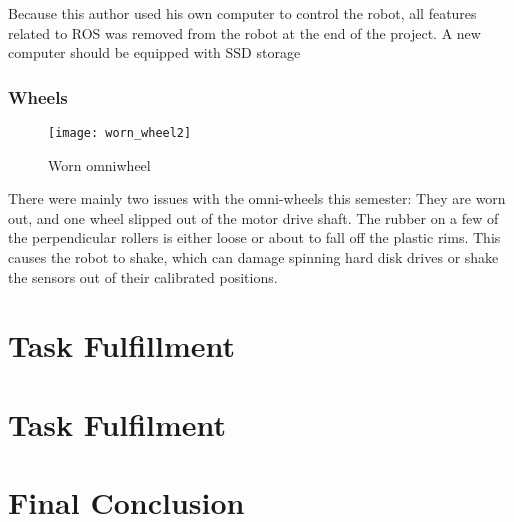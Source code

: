 Because this author used his own computer to control the robot, all features related to \ac{ROS} was removed from the robot at the end of the project. A new computer should be equipped with \ac{SSD} storage

\subsubsection{Wheels}

\begin{wrapfigure}{r}{0.5\textwidth}
	\vspace{-20pt}
	\begin{center}
		\texttt{[image: worn\_wheel2]}
	\end{center}
	
	\caption{Worn omniwheel}
	\label{fig:worn_wheel}
\end{wrapfigure}

There were mainly two issues with the omni-wheels this semester: They are worn out, and one wheel slipped out of the motor drive shaft. The rubber on a few of the perpendicular rollers is either loose or about to fall off the plastic rims. This causes the robot to shake, which can damage spinning hard disk drives or shake the sensors out of their calibrated positions.   





\section{Task Fulfillment}

\section{Task Fulfilment}

\section{Final Conclusion}